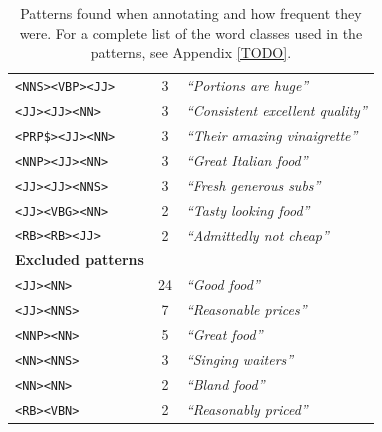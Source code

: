 \documentclass[a4paper,11pt]{kth-mag}
\begin{document}
\begin{table}[t]
\begin{tabular}{| l | c | l |}
    \texttt{<NNS><VBP><JJ>} & 3 & \emph{``Portions are huge''}\\
    \texttt{<JJ><JJ><NN>} & 3 & \emph{``Consistent excellent quality''}\\
    \texttt{<PRP\$><JJ><NN>} & 3 & \emph{``Their amazing vinaigrette''}\\
    \texttt{<NNP><JJ><NN>} & 3 & \emph{``Great Italian food''}\\
    \texttt{<JJ><JJ><NNS>} & 3 & \emph{``Fresh generous subs''}\\
    \texttt{<JJ><VBG><NN>} & 2 & \emph{``Tasty looking food''}\\
    \texttt{<RB><RB><JJ>} & 2 & \emph{``Admittedly not cheap''}\\
    \hline
    \textbf{Excluded patterns} && \\
    \hline
    \texttt{<JJ><NN>} & 24 & \emph{``Good food''}\\
    \texttt{<JJ><NNS>} & 7 & \emph{``Reasonable prices''}\\
    \texttt{<NNP><NN>} & 5 & \emph{``Great food''}\\
    \texttt{<NN><NNS>} & 3 & \emph{``Singing waiters''}\\
    \texttt{<NN><NN>} & 2 & \emph{``Bland food''}\\
    \texttt{<RB><VBN>} & 2 & \emph{``Reasonably priced''}\\
    \hline
  \end{tabular}
  \caption{Patterns found when annotating and how frequent they were.
    For a complete list of the word classes used in the patterns, see Appendix \ref{TODO}.
  }
  \label{tab:used_pos}
\end{table}
\end{document}
